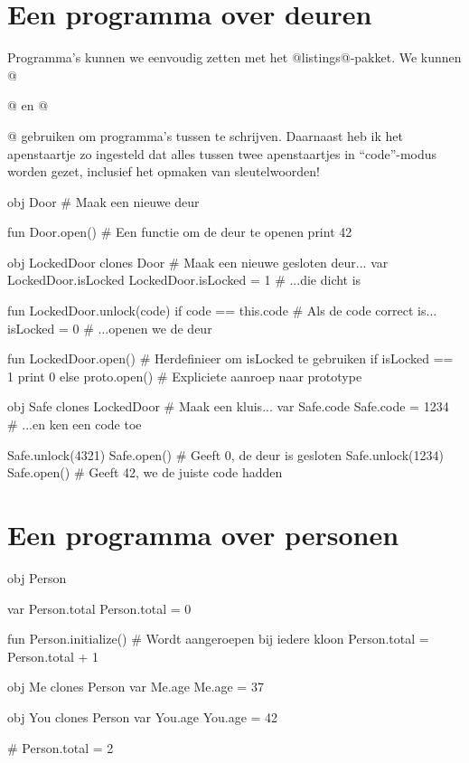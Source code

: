 \section{Een programma over deuren}

Programma's kunnen we eenvoudig zetten met het @listings@-pakket. We kunnen @\begin{program}@ en @\end{program}@ gebruiken om programma's tussen te schrijven. Daarnaast heb ik het apenstaartje zo ingesteld dat alles tussen twee apenstaartjes in ``code''-modus worden gezet, inclusief het opmaken van sleutelwoorden!

\begin{program}
obj Door                     # Maak een nieuwe deur

fun Door.open()              # Een functie om de deur te openen
    print 42

obj LockedDoor clones Door   # Maak een nieuwe gesloten deur...
var LockedDoor.isLocked
LockedDoor.isLocked = 1      # ...die dicht is

fun LockedDoor.unlock(code)
    if code == this.code     # Als de code correct is...
        isLocked = 0         # ...openen we de deur

fun LockedDoor.open()        # Herdefinieer om isLocked te gebruiken
    if isLocked == 1
        print 0
    else
        proto.open()         # Expliciete aanroep naar prototype

obj Safe clones LockedDoor   # Maak een kluis...
var Safe.code
Safe.code = 1234             # ...en ken een code toe

Safe.unlock(4321)
Safe.open()                  # Geeft 0, de deur is gesloten
Safe.unlock(1234)
Safe.open()                  # Geeft 42, we de juiste code hadden
\end{program}

\section{Een programma over personen}

\begin{program}
obj Person

var Person.total
Person.total = 0

fun Person.initialize()      # Wordt aangeroepen bij iedere kloon
    Person.total = Person.total + 1

obj Me clones Person
var Me.age
Me.age = 37

obj You clones Person
var You.age
You.age = 42

# Person.total = 2
\end{program}

